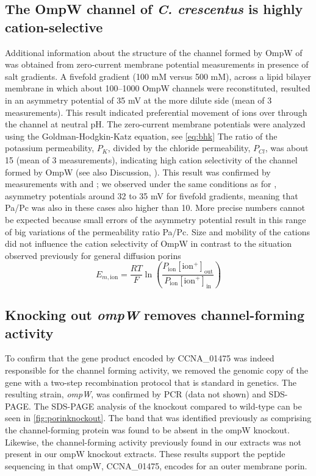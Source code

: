\subsection{The OmpW channel of \textit{C. crescentus} is highly cation-selective}

Additional information about the structure of the channel formed by OmpW of \caulobacter was obtained from zero-current membrane potential measurements in presence of salt gradients. A fivefold  gradient (100 mM versus 500 mM), across a lipid bilayer membrane in which about 100--1000 OmpW channels were reconstituted, resulted in an asymmetry potential of 35 mV at the more dilute side (mean of 3 measurements). This result indicated preferential movement of  ions over  through the channel at neutral pH. The zero-current membrane potentials were analyzed using the Goldman-Hodgkin-Katz equation, see \cref{eq:bhk} The ratio of the potassium permeability, $P_K$, divided by the chloride permeability, $P_{Cl}$, was about 15 (mean of 3 measurements), indicating high cation selectivity of the channel formed by OmpW (see also Discussion, ). This result was confirmed by measurements with  and ; we observed under the same conditions as for , asymmetry potentials around 32 to 35 mV for fivefold gradients, meaning that Pa/Pc was also in these cases also higher than 10. More precise numbers cannot be expected because small errors of the asymmetry potential result in this range of big variations of the permeability ratio Pa/Pc. Size and mobility of the cations did not influence the cation selectivity of OmpW in contrast to the situation observed previously for general diffusion porins
\begin{equation} \label{eq:bhk}
  E_{m,\text{ion}} = \frac{RT}{F} \ln{ \left( \frac{ P_{\text{ion}}[\text{ion}^{+}]_\mathrm{out}}{ P_{\text{ion}}[\text{ion}^{+}]_\mathrm{in}} \right) }
\end{equation}

\subsection{Knocking out \textit{ompW} removes channel-forming activity} \label{sec:knocking-out-ompw}

To confirm that the gene product encoded by CCNA\_01475 was indeed responsible for the channel forming activity, we removed the genomic copy of the gene with a two-step recombination protocol that is standard in \caulobacter genetics. The resulting strain, \caulobacter \del \textit{ompW}, was confirmed by \ac{PCR} (data not shown) and \ac{SDS-PAGE}. The \ac{SDS-PAGE} analysis of the knockout compared to wild-type can be seen in \cref{fig:porinknockout}. The band that was identified previously as comprising the channel-forming protein was found to be absent in the ompW knockout. Likewise, the channel-forming activity previously found in our extracts was not present in our ompW knockout extracts. These results support the peptide sequencing in that ompW, CCNA\_01475, encodes for an outer membrane porin.

